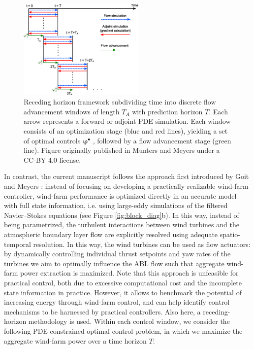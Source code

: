 \documentclass[energies,article,submit,moreauthors,latex,10pt,a4paper]{mdpi}
\newcommand{\bs}[1]{\boldsymbol{#1}}
\begin{document}
\begin{figure}
	\centering
	\includegraphics[width=0.55\textwidth]{figure2}
	\caption{Receding horizon framework subdividing time into discrete flow advancement windows of length $T_A$ with prediction horizon $T$. Each arrow represents a forward or adjoint PDE simulation. Each window consists of an optimization stage (blue and red lines), yielding a set of optimal controls $\bs{\varphi}^\bullet$ , followed by a flow advancement stage (green line). Figure originally published in Munters and Meyers \cite{munters2017optimal} under a CC-BY 4.0 license. \label{fig:receding_horizon}}
\end{figure}

In contrast, the current manuscript follows the approach first introduced by Goit and Meyers \cite{goit2015optimal}: instead of focusing on developing a practically realizable wind-farm controller, wind-farm performance is optimized directly in an accurate model with full state information, i.e. using large-eddy simulations of the filtered Navier--Stokes equations (see Figure \ref{fig:block_diag}b). In this way, instead of being parametrized, the turbulent interactions between wind turbines and the atmospheric boundary layer flow are explicitly resolved using adequate spatio-temporal resolution. In this way, the wind turbines can be used as flow actuators: by dynamically controlling individual thrust setpoints and yaw rates of the turbines we aim to optimally influence the ABL flow such that aggregate wind-farm power extraction is maximized.  Note that this approach is unfeasible for practical control, both due to excessive computational cost and the incomplete state information in practice. However, it allows to benchmark the potential of increasing energy through wind-farm control, and can help identify control mechanisms to be harnessed by practical controllers. Also here, a receding-horizon methodology is used. Within each control window, we consider the following PDE-constrained optimal control problem, in which we maximize the aggregate wind-farm power over a time horizon $T$:
\end{document}
